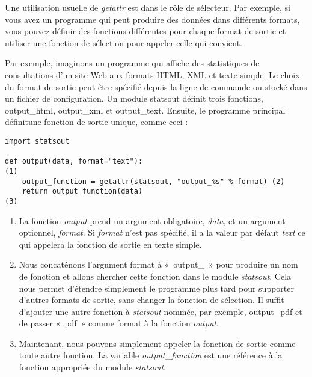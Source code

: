 Une utilisation usuelle de \emph{getattr} est dans le rôle de sélecteur. Par exemple, si vous avez un programme qui peut produire des données dans différents formats, vous pouvez définir des fonctions différentes pour chaque format de sortie et utiliser une fonction de sélection pour appeler celle qui convient.

Par exemple, imaginons un programme qui affiche des statistiques de consultations d'un site Web aux formats HTML, XML et texte simple. Le choix du format de sortie peut être spécifié depuis la ligne de commande ou stocké dans un fichier de configuration. Un module statsout définit trois fonctions, output\_html, output\_xml et output\_text. Ensuite, le programme principal définitune fonction de sortie unique, comme ceci :

\begin{example}
\begin{lstlisting}
import statsout

def output(data, format="text"):                                            (1)
    output_function = getattr(statsout, "output_%s" % format) (2)
    return output_function(data)                                             (3)
\end{lstlisting}
\end{example}

\begin{enumerate}
    \item{La fonction \emph{output} prend un argument obligatoire, \emph{data}, et un argument optionnel, \emph{format}. Si \emph{format} n'est pas spécifié, il a la valeur par défaut \emph{text} ce qui appelera la fonction de sortie en texte simple.}
    \item{Nous concaténons l'argument format à «~output\_~» pour produire un nom de fonction et allons chercher cette fonction dans le module \emph{statsout}. Cela nous  permet d'étendre simplement le programme plus tard pour supporter d'autres formats de sortie, sans changer la fonction de sélection. Il suffit d'ajouter une autre fonction à \emph{statsout} nommée, par exemple, output\_pdf et de passer «~pdf~» comme format à la fonction \emph{output}.}
    \item{Maintenant, nous pouvons simplement appeler la fonction de sortie comme toute autre fonction. La variable \emph{output\_function} est une référence à la fonction appropriée du module \emph{statsout}.}
\end{enumerate}

